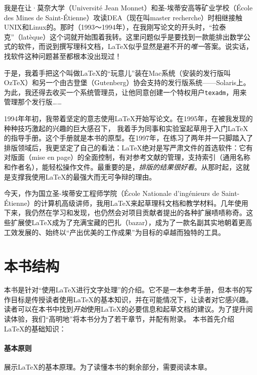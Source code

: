 我是在让·莫奈大学（Université Jean Monnet）和圣-埃蒂安高等矿业学校（École des Mines de Saint-Étienne）攻读DEA（现在叫master recherche）时相继接触UNIX和Linux的。那时（1993～1994年），在我刚写论文的开头时，“拉泰克”（latèque）这个词就开始围着我转。这里问题似乎是要找到一款能排出数学公式的软件，而说到撰写理科文档，\LaTeX 似乎显然是避不开的\textit{唯一}答案。说实话，找软件这种问题甚至都根本没出现过！

于是，我着手把这个叫做\LaTeX 的“玩意儿”装在Mac系统（安装的发行版叫Oz\TeX ）和另一个由古登堡（Gutenberg）协会支持的发行版系统——Solaris上。为此，我还得去收买一个系统管理员，让他同意创建一个特权用户\texttt{texadm}，用来管理那个发行版……

1994年年初，我带着坚定的意志使用\LaTeX 开始写论文。在1995年，在被我发现的种种技巧激起的兴趣的巨大感召下，%
我着手为同事和实验室起草用于入门\LaTeX 的指导手册。这个手册就是本书的原型。在1997年，在练习了两年并一只脚踏入了排版领域后，我更坚定了自己的看法：\LaTeX 绝对是写严肃文件的首选软件：它有对版面（mise en page）的全面控制，有对参考文献的管理，支持索引（通用名称和作者名），能轻松操作文件。最重要的是，\textit{排版的结果很好看}。从那时起，这就是支撑我使用\LaTeX 的最强大而无可争辩的理由。

今天，作为国立圣-埃蒂安工程师学院（École Nationale d’ingénieurs de Saint-Étienne）的计算机高级讲师，我用\LaTeX 来起草理科文档和教学材料。几年使用下来，我仍然在学习和发现，也仍然会对项目贡献者提出的各种扩展啧啧称奇。这些扩展使\LaTeX 成为了充满宝藏的巴扎（bazar），成为了一款名副其实地朝着更高工效发展的、始终以“产出优美的工作成果”为目标的卓越而独特的工具。

\section*{本书结构}

本书是针对“使用\LaTeX 进行文字处理”的介绍。它不是一本参考手册，但本书的写作目标是传授读者使用\LaTeX 的基本知识，并在可能情况下，让读者对它感兴趣。读者可以在本书中找到\textit{开始}使用\LaTeX 的必要信息和起草文档的建议。为了提升阅读体验，我们“高明地”将本书分为了若干章节，并配有附录。
本书首先介绍\LaTeX 的基础知识：

\paragraph*{基本原则}展示\LaTeX 的基本原理。为了读懂本书的剩余部分，需要阅读本章。

